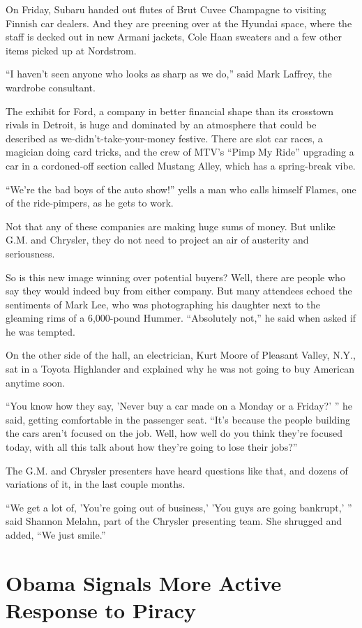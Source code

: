 \documentclass[12pt,a4paper,onecolumn]{article}
\begin{document}
On Friday, Subaru handed out flutes of Brut Cuvee Champagne to visiting Finnish car dealers. And
they are preening over at the Hyundai space, where the staff is decked out in new Armani jackets,
Cole Haan sweaters and a few other items picked up at Nordstrom.

``I haven't seen anyone who looks as sharp as we do,'' said Mark Laffrey, the wardrobe consultant.

The exhibit for Ford, a company in better financial shape than its crosstown rivals in Detroit, is
huge and dominated by an atmosphere that could be described as we-didn't-take-your-money festive.
There are slot car races, a magician doing card tricks, and the crew of MTV's ``Pimp My Ride''
upgrading a car in a cordoned-off section called Mustang Alley, which has a spring-break vibe.

``We're the bad boys of the auto show!'' yells a man who calls himself Flames, one of the
ride-pimpers, as he gets to work.

Not that any of these companies are making huge sums of money. But unlike G.M. and Chrysler, they do
not need to project an air of austerity and seriousness.

So is this new image winning over potential buyers? Well, there are people who say they would indeed
buy from either company. But many attendees echoed the sentiments of Mark Lee, who was photographing
his daughter next to the gleaming rims of a 6,000-pound Hummer. ``Absolutely not,'' he said when
asked if he was tempted.

On the other side of the hall, an electrician, Kurt Moore of Pleasant Valley, N.Y., sat in a Toyota
Highlander and explained why he was not going to buy American anytime soon.

``You know how they say, 'Never buy a car made on a Monday or a Friday?' '' he said, getting
comfortable in the passenger seat. ``It's because the people building the cars aren't focused on the
job. Well, how well do you think they're focused today, with all this talk about how they're going
to lose their jobs?''

The G.M. and Chrysler presenters have heard questions like that, and dozens of variations of it, in
the last couple months.

``We get a lot of, 'You're going out of business,' 'You guys are going bankrupt,' '' said Shannon
Melahn, part of the Chrysler presenting team. She shrugged and added, ``We just smile.''

\section{Obama Signals More Active Response to Piracy}
\end{document}

